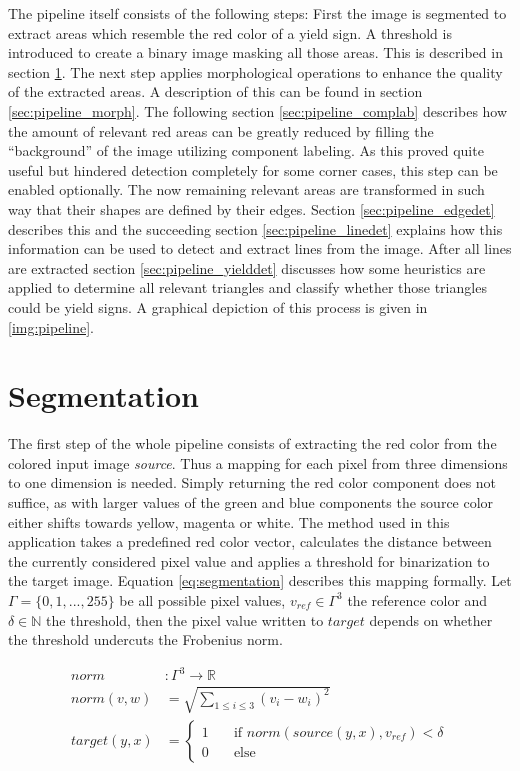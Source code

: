 \documentclass{report}
\begin{document}
The pipeline itself consists of the following steps: First the image
is segmented to extract areas which resemble the red color of a yield
sign. A threshold is introduced to create a binary image masking all
those areas. This is described in section
\ref{sec:pipeline_binarization}. The next step applies morphological
operations to enhance the quality of the extracted areas. A
description of this can be found in section
\ref{sec:pipeline_morph}. The following section
\ref{sec:pipeline_complab} describes how the amount of relevant red
areas can be greatly reduced by filling the ``background'' of the
image utilizing component labeling. As this proved quite useful but
hindered detection completely for some corner cases, this step can be
enabled optionally. The now remaining relevant areas are transformed
in such way that their shapes are defined by their edges. Section
\ref{sec:pipeline_edgedet} describes this and the succeeding section
\ref{sec:pipeline_linedet} explains how this information can be used
to detect and extract lines from the image. After all lines are
extracted section \ref{sec:pipeline_yielddet} discusses how some
heuristics are applied to determine all relevant triangles and
classify whether those triangles could be yield signs. A graphical
depiction of this process is given in \ref{img:pipeline}.


\section{Segmentation}
\label{sec:pipeline_binarization}

The first step of the whole pipeline consists of extracting the red
color from the colored input image \textit{source}. Thus a mapping for
each pixel from three dimensions to one dimension is needed. Simply
returning the red color component does not suffice, as with larger
values of the green and blue components the source color either shifts
towards yellow, magenta or white. The method used in this application
takes a predefined red color vector, calculates the distance between
the currently considered pixel value and applies a threshold for
binarization to the target image. Equation \ref{eq:segmentation}
describes this mapping formally. Let \( \Gamma = \{0, 1, ..., 255\} \)
be all possible pixel values, \( v_{ref} \in \Gamma^3 \) the reference
color and \( \delta \in \mathbb{N} \) the threshold, then the pixel
value written to \( target \) depends on whether the threshold
undercuts the Frobenius norm.

\begin{equation}\label{eq:segmentation}
  \begin{split}
    norm & : \Gamma^3 \to \mathbb{R} \\
    norm(v, w) & = \sqrt{\sum_{1 \leq i \leq 3}(v_i - w_i)^2}  \\
    target(y, x) & =
    \begin{cases}
      1 & \quad \text{if } norm(source(y, x), v_{ref}) < \delta \\
      0 & \quad \text{else}
    \end{cases}
  \end{split}
\end{equation}
\end{document}
